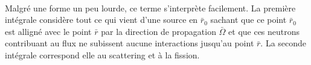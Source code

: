 \ \\

Malgré une forme un peu lourde, ce terme s'interprète facilement. La première intégrale considère 
tout ce qui vient d'une source en $\bar r_0$ sachant que ce point $\bar r_0$ est alligné avec 
le point $\bar r$ par la direction de propagation $\bar\Omega$ et que ces neutrons contribuant au 
flux ne subissent aucune interactions jusqu'au point $\bar r$. La seconde intégrale correspond elle 
au scattering et à la fission.


